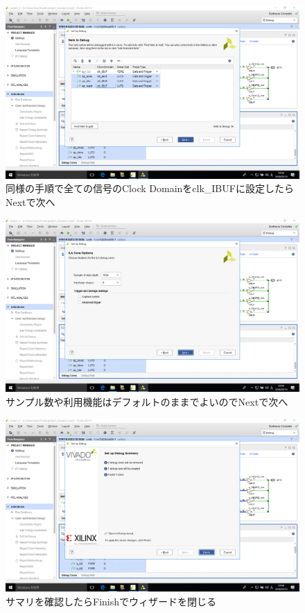 \documentclass[a4paper,dvipdfmx]{jsarticle}
\begin{document}
 \begin{figure}[H]
  \begin{center}
   \includegraphics[width=.8\textwidth]{chapter08_figures/VirtualBox_Windows10_19_03_2018_23_56_44.png}
  \end{center}
  \caption{同様の手順で全ての信号のClock Domainをclk\_IBUFに設定したらNextで次へ}
 \end{figure}

 \begin{figure}[H]
  \begin{center}
   \includegraphics[width=.8\textwidth]{chapter08_figures/VirtualBox_Windows10_19_03_2018_23_56_52.png}
  \end{center}
  \caption{サンプル数や利用機能はデフォルトのままでよいのでNextで次へ}
 \end{figure}

 \begin{figure}[H]
  \begin{center}
   \includegraphics[width=.8\textwidth]{chapter08_figures/VirtualBox_Windows10_19_03_2018_23_58_59.png}
  \end{center}
  \caption{サマリを確認したらFinishでウィザードを閉じる}
 \end{figure}
\end{document}
